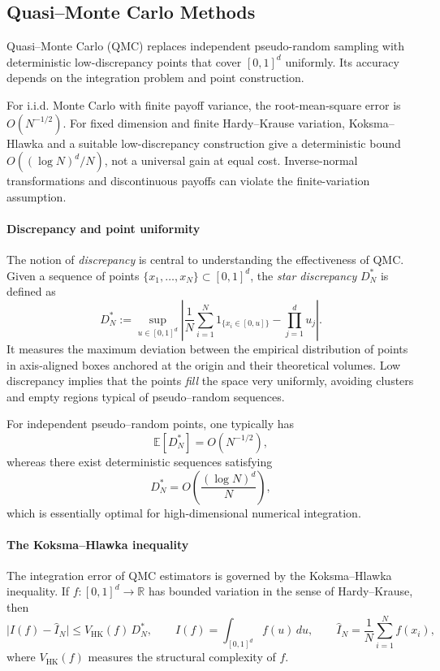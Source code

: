 
\subsection{Quasi--Monte Carlo Methods}

Quasi--Monte Carlo (QMC) replaces independent pseudo-random sampling
with deterministic low-discrepancy points that cover $[0,1]^d$ uniformly.
Its accuracy depends on the integration problem and point construction.

For i.i.d. Monte Carlo with finite payoff variance, the root-mean-square
error is $O(N^{-1/2})$. For fixed dimension and finite Hardy--Krause
variation, Koksma--Hlawka and a suitable low-discrepancy construction
give a deterministic bound $O((\log N)^d/N)$, not a universal gain at
equal cost. Inverse-normal transformations and discontinuous payoffs
can violate the finite-variation assumption.
\paragraph{Discrepancy and point uniformity}

The notion of \emph{discrepancy} is central to understanding the effectiveness of QMC.  
Given a sequence of points $\{x_1,\dots,x_N\}\subset [0,1]^d$, the \emph{star discrepancy} $D_N^*$ is defined as
\[
D_N^* := 
\sup_{u \in [0,1]^d}
\left|
\frac{1}{N}
\sum_{i=1}^N 1_{\{x_i\in [0,u]\}}
- \prod_{j=1}^d u_j
\right|.
\]
It measures the maximum deviation between the empirical distribution of points in axis-aligned boxes anchored at the origin and their theoretical volumes.  
Low discrepancy implies that the points \emph{fill} the space very uniformly, avoiding clusters and empty regions typical of pseudo--random sequences.

For independent pseudo--random points, one typically has
\[
\mathbb{E}[D_N^*] = O(N^{-1/2}),
\]
whereas there exist deterministic sequences satisfying
\[
D_N^* = O\!\left(\frac{(\log N)^d}{N}\right),
\]
which is essentially optimal for high-dimensional numerical integration.
\paragraph{The Koksma--Hlawka inequality}

The integration error of QMC estimators is governed by the Koksma--Hlawka inequality.  
If $f:[0,1]^d\to\mathbb{R}$ has bounded variation in the sense of Hardy--Krause, then
\[
\big|I(f) - \widehat{I}_N\big|
\le V_{\mathrm{HK}}(f)\, D_N^*,
\qquad 
I(f)=\int_{[0,1]^d} f(u) \, du,
\qquad 
\widehat{I}_N=\frac{1}{N}\sum_{i=1}^N f(x_i),
\]
where $V_{\mathrm{HK}}(f)$ measures the structural complexity of $f$.

